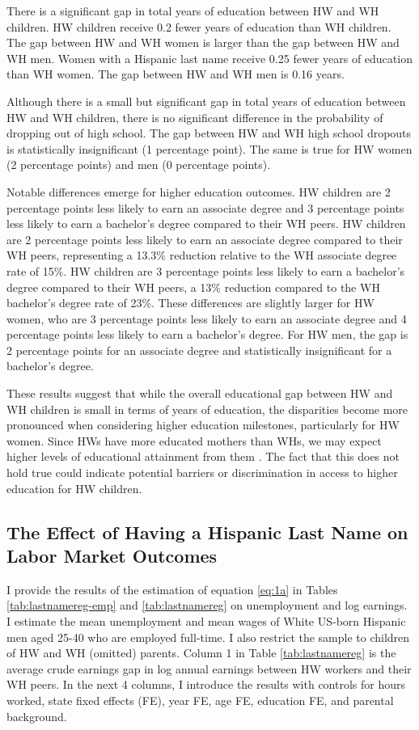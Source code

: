 There is a significant gap in total years of education between HW and WH children. HW children receive 0.2 fewer years of education than WH children. The gap between HW and WH women is larger than the gap between HW and WH men. Women with a Hispanic last name receive 0.25 fewer years of education than WH women. The gap between HW and WH men is 0.16 years.

Although there is a small but significant gap in total years of education between HW and WH children, there is no significant difference in the probability of dropping out of high school. The gap between HW and WH high school dropouts is statistically insignificant (1 percentage point). The same is true for HW women (2 percentage points) and men (0 percentage points).

Notable differences emerge for higher education outcomes. HW children are 2 percentage points less likely to earn an associate degree and 3 percentage points less likely to earn a bachelor’s degree compared to their WH peers. HW children are 2 percentage points less likely to earn an associate degree compared to their WH peers, representing a 13.3\% reduction relative to the WH associate degree rate of 15\%. HW children are 3 percentage points less likely to earn a bachelor’s degree compared to their WH peers, a 13\% reduction compared to the WH bachelor’s degree rate of 23\%. These differences are slightly larger for HW women, who are 3 percentage points less likely to earn an associate degree and 4 percentage points less likely to earn a bachelor’s degree. For HW men, the gap is 2 percentage points for an associate degree and statistically insignificant for a bachelor’s degree.

These results suggest that while the overall educational gap between HW and WH children is small in terms of years of education, the disparities become more pronounced when considering higher education milestones, particularly for HW women. Since HWs have more educated mothers than WHs, we may expect higher levels of educational attainment from them \autocite{kimball2009risk, gould2020does}. The fact that this does not hold true could indicate potential barriers or discrimination in access to higher education for HW children.

\subsection{The Effect of Having a Hispanic Last Name on Labor Market Outcomes}

I provide the results of the estimation of equation \ref{eq:1a} in Tables \ref{tab:lastnamereg-emp} and \ref{tab:lastnamereg} on unemployment and log earnings. I estimate the mean unemployment and mean wages of White US-born Hispanic men aged 25-40 who are employed full-time. I also restrict the sample to children of HW and WH (omitted) parents.  Column 1 in Table \ref{tab:lastnamereg} is the average crude earnings gap in log annual earnings between HW workers and their WH peers. In the next 4 columns, I introduce the results with controls for hours worked, state fixed effects (FE), year FE, age FE, education FE, and parental background.

